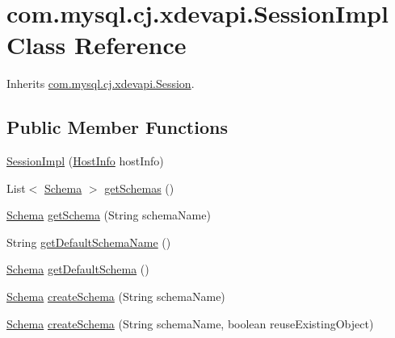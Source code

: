 \hypertarget{classcom_1_1mysql_1_1cj_1_1xdevapi_1_1_session_impl}{}\section{com.\+mysql.\+cj.\+xdevapi.\+Session\+Impl Class Reference}
\label{classcom_1_1mysql_1_1cj_1_1xdevapi_1_1_session_impl}


Inherits \mbox{\hyperlink{interfacecom_1_1mysql_1_1cj_1_1xdevapi_1_1_session}{com.\+mysql.\+cj.\+xdevapi.\+Session}}.

\subsection*{Public Member Functions}
\begin{DoxyCompactItemize}
\item 
\mbox{\hyperlink{classcom_1_1mysql_1_1cj_1_1xdevapi_1_1_session_impl_accebe952a26b96f742b99bdbcfcd27f7}{Session\+Impl}} (\mbox{\hyperlink{classcom_1_1mysql_1_1cj_1_1conf_1_1_host_info}{Host\+Info}} host\+Info)
\item 
List$<$ \mbox{\hyperlink{interfacecom_1_1mysql_1_1cj_1_1xdevapi_1_1_schema}{Schema}} $>$ \mbox{\hyperlink{classcom_1_1mysql_1_1cj_1_1xdevapi_1_1_session_impl_a2d607f33ef3231038642b5836b813531}{get\+Schemas}} ()
\item 
\mbox{\hyperlink{interfacecom_1_1mysql_1_1cj_1_1xdevapi_1_1_schema}{Schema}} \mbox{\hyperlink{classcom_1_1mysql_1_1cj_1_1xdevapi_1_1_session_impl_aeb00f17f0c469af51f790c4a73666904}{get\+Schema}} (String schema\+Name)
\item 
String \mbox{\hyperlink{classcom_1_1mysql_1_1cj_1_1xdevapi_1_1_session_impl_a4aa237ed5d2cfe61c302a11907533b61}{get\+Default\+Schema\+Name}} ()
\item 
\mbox{\hyperlink{interfacecom_1_1mysql_1_1cj_1_1xdevapi_1_1_schema}{Schema}} \mbox{\hyperlink{classcom_1_1mysql_1_1cj_1_1xdevapi_1_1_session_impl_adba641099e94d53a50b08abc745d761b}{get\+Default\+Schema}} ()
\item 
\mbox{\hyperlink{interfacecom_1_1mysql_1_1cj_1_1xdevapi_1_1_schema}{Schema}} \mbox{\hyperlink{classcom_1_1mysql_1_1cj_1_1xdevapi_1_1_session_impl_a21dd320f0e162d26784465aa6bb859ce}{create\+Schema}} (String schema\+Name)
\item 
\mbox{\hyperlink{interfacecom_1_1mysql_1_1cj_1_1xdevapi_1_1_schema}{Schema}} \mbox{\hyperlink{classcom_1_1mysql_1_1cj_1_1xdevapi_1_1_session_impl_ae98234f9b7a73f758946297806aeb639}{create\+Schema}} (String schema\+Name, boolean reuse\+Existing\+Object)

\end{DoxyCompactItemize}
